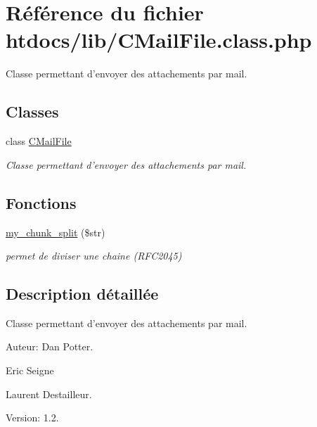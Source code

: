 \hypertarget{CMailFile_8class_8php}{
\section{R\'{e}f\'{e}rence du fichier htdocs/lib/CMail\-File.class.php}
\label{CMailFile_8class_8php}
}
Classe permettant d'envoyer des attachements par mail.  


\subsection*{Classes}
\begin{CompactItemize}
\item 
class \hyperlink{classCMailFile}{CMail\-File}
\begin{CompactList}\small\item\em Classe permettant d'envoyer des attachements par mail. \item\end{CompactList}\end{CompactItemize}
\subsection*{Fonctions}
\begin{CompactItemize}
\item 
\hyperlink{CMailFile_8class_8php_a0}{my\_\-chunk\_\-split} (\$str)
\begin{CompactList}\small\item\em permet de diviser une chaine (RFC2045) \item\end{CompactList}\end{CompactItemize}


\subsection{Description d\'{e}taill\'{e}e}
Classe permettant d'envoyer des attachements par mail. 

\begin{Desc}
\item[Auteur:]Dan Potter. 

Eric Seigne 

Laurent Destailleur. \end{Desc}
\begin{Desc}
\item[Version:]1.2.\end{Desc}



